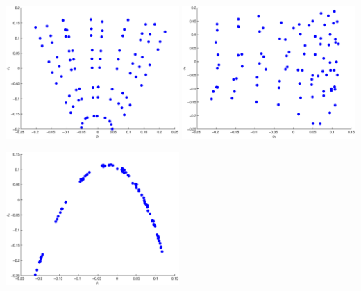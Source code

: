 \documentclass[12pt]{article}
\begin{document}
\includegraphics[height=2in]{lle_embed1_1}
\includegraphics[height=2in]{lle_embed2_2}

\hfill 
\includegraphics[height=2in]{lle_embed1_2}
\end{document}
